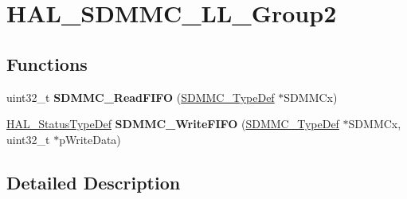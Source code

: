 \hypertarget{group___h_a_l___s_d_m_m_c___l_l___group2}{}\section{H\+A\+L\+\_\+\+S\+D\+M\+M\+C\+\_\+\+L\+L\+\_\+\+Group2}
\label{group___h_a_l___s_d_m_m_c___l_l___group2}
\subsection*{Functions}
\begin{DoxyCompactItemize}
\item 
\mbox{\label{group___h_a_l___s_d_m_m_c___l_l___group2_gaa1b002dbf9eb6c153cc61467df3dcd99}} 
uint32\+\_\+t {\bfseries S\+D\+M\+M\+C\+\_\+\+Read\+F\+I\+FO} (\mbox{\hyperlink{struct_s_d_m_m_c___type_def}{S\+D\+M\+M\+C\+\_\+\+Type\+Def}} $\ast$S\+D\+M\+M\+Cx)
\item 
\mbox{\label{group___h_a_l___s_d_m_m_c___l_l___group2_ga74c53c1f5933944584c650b93e7713c9}} 
\mbox{\hyperlink{stm32f7xx__hal__def_8h_a63c0679d1cb8b8c684fbb0632743478f}{H\+A\+L\+\_\+\+Status\+Type\+Def}} {\bfseries S\+D\+M\+M\+C\+\_\+\+Write\+F\+I\+FO} (\mbox{\hyperlink{struct_s_d_m_m_c___type_def}{S\+D\+M\+M\+C\+\_\+\+Type\+Def}} $\ast$S\+D\+M\+M\+Cx, uint32\+\_\+t $\ast$p\+Write\+Data)
\end{DoxyCompactItemize}


\subsection{Detailed Description}
